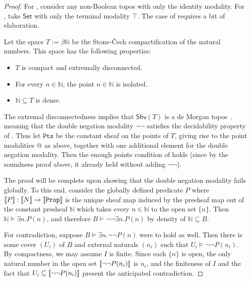 \documentclass[reqno,11pt]{amsproc}
\makeatletter
\theoremstyle{plain}
\theoremstyle{definition}
\DeclarePairedDelimiter{\church}{\llbracket}{\rrbracket}
\newcommand{\Const}[1]{\mathtt{#1}}
\newcommand{\cat}[1]{\mathsf{#1}}
\renewcommand{\to}[1][]{\xrightarrow{#1}}
\newcommand{\nn}{\mathbb{N}}
\newcommand{\shv}{\cat{Shv}}
\newcommand{\prop}{\Const{Prop}}
\newcommand{\pt}{x}
\newcommand{\pts}{\mathtt{Pts}}		%
\newcommand{\atsymbol}{{@}}
\newcommand{\at}[1][\pt]{\atsymbol_{#1}}
\numberwithin{equation}{section}
\makeatother
\begin{document}
\begin{proof}
	For , consider any non-Boolean topos with only the identity modality. For , take $\cat{Set}$ with only the terminal modality $\top$. The case of  requires a bit of elaboration.

	Let the space $T := \beta\nn$ be the Stone-\v{C}ech compactification of the natural numbers. This space has the following properties:
	\begin{itemize}
		\item $T$ is compact and extremally disconnected.
		\item For every $n \in \nn$, the point $n \in \nn$ is isolated.
		\item $\nn \subseteq T$ is dense.
	\end{itemize}
	The extremal disconnectedness implies that $\shv(T)$ is a de Morgan topos~\cite[D4.6]{elephant2}, meaning that the double negation modality $\lnot\lnot$ satisfies the decidability property of . Thus let $\pts$ be the constant sheaf on the points of $T$, giving rise to the point modalities $\at[]$ as above, together with one additional element for the double negation modality. Then the enough points condition of  holds (since by the soundness proof above, it already held without adding $\neg\neg$). 
	
	The proof will be complete upon showing that the double negation modality fails  globally. To this end, consider the globally defined predicate $P$ where $\church{P} : \church{N} \to \church{\prop}$ is the unique sheaf map induced by the presheaf map out of the constant presheaf $\nn$ which takes every $n \in \nn$ to the open set $\{n\}$. Then $\nn \models \exists n. P(n)$, and therefore $B \models \lnot \lnot \exists n. P(n)$ by density of $\nn \subseteq B$. 
	
	For contradiction, suppose $B \models \exists n . \lnot\lnot P(n)$ were to hold as well. Then there  is some cover $(U_i)$ of $B$ and external naturals $(n_i)$ such that $U_i\models\neg\neg P(n_i)$. By compactness, we may assume $I$ is finite. Since each $\{n\}$ is open, the only natural number in the open set $\church{\neg\neg P(n_i)}$ is $n_i$, and the finiteness of $I$ and the fact that $U_i\subseteq \church{\neg\neg P(n_i)}$ present the anticipated contradiction.

%
	

\end{proof}
\end{document}

